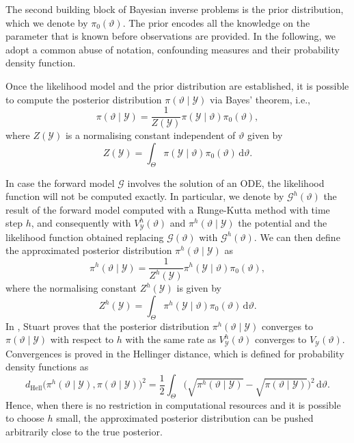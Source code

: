 \documentclass{siamart1116}
\numberwithin{theorem}{section}
\renewcommand{\theta}{\vartheta}
\newcommand{\Hell}{d_{\mathrm{Hell}}}
\newcommand{\dd}{\mathrm{d}}
\begin{document}
The second building block of Bayesian inverse problems is the prior distribution, which we denote by $\pi_0(\theta)$. The prior encodes all the knowledge on the parameter that is known before observations are provided. In the following, we adopt a common abuse of notation, confounding measures and their probability density function. 

Once the likelihood model and the prior distribution are established, it is possible to compute the posterior distribution $\pi(\theta \mid \mathcal{Y})$ via Bayes' theorem, i.e.,
\begin{equation}
	\pi(\theta\mid\mathcal{Y}) = \frac{1}{Z(\mathcal{Y})} \pi(\mathcal{Y}\mid \theta)\pi_0(\theta) ,
\end{equation}
where $Z(\mathcal{Y})$ is a normalising constant independent of $\theta$ given by
\begin{equation}
	Z(\mathcal{Y}) = \int_{\Theta} \pi(\mathcal{Y}\mid \theta) \pi_0(\theta) \, \dd \theta.
\end{equation}

In case the forward model $\mathcal{G}$ involves the solution of an ODE, the likelihood function will not be computed exactly. In particular, we denote by $\mathcal{G}^h(\theta)$ the result of the forward model computed with a Runge-Kutta method with time step $h$, and consequently with $V^h_\mathcal{Y}(\theta)$ and $\pi^h(\theta\mid\mathcal{Y})$ the potential and the likelihood function obtained replacing $\mathcal{G}(\theta)$ with $\mathcal{G}^h(\theta)$. We can then define the approximated posterior distribution $\pi^h(\theta \mid \mathcal{Y})$ as
\begin{equation}
	\pi^h(\theta\mid\mathcal{Y}) = \frac{1}{Z^h(\mathcal{Y})} \pi^h(\mathcal{Y}\mid \theta)\pi_0(\theta),
\end{equation}
where the normalising constant $Z^h(\mathcal{Y})$ is given by
\begin{equation}
	Z^h(\mathcal{Y}) = \int_{\Theta} \pi^h(\mathcal{Y}\mid \theta) \pi_0(\theta) \, \dd \theta.
\end{equation}
In \cite[Theorem 4.6]{Stu10}, Stuart proves that the posterior distribution $\pi^h(\theta\mid\mathcal{Y})$ converges to $\pi(\theta\mid\mathcal{Y})$ with respect to $h$ with the same rate as $V^h_\mathcal{Y}(\theta)$ converges to $V_\mathcal{Y}(\theta)$. Convergences is proved in the Hellinger distance, which is defined for probability density functions as
\begin{equation}
	\Hell\big(\pi^h(\theta\mid\mathcal{Y}), \pi(\theta\mid\mathcal{Y})\big)^2 = \frac{1}{2}\int_{\Theta} \Big(\sqrt{\pi^h(\theta\mid\mathcal{Y})} - \sqrt{\pi(\theta\mid\mathcal{Y})}\Big)^2 \, \dd \theta.
\end{equation}
Hence, when there is no restriction in computational resources and it is possible to choose $h$ small, the approximated posterior distribution can be pushed arbitrarily close to the true posterior.
\end{document}
